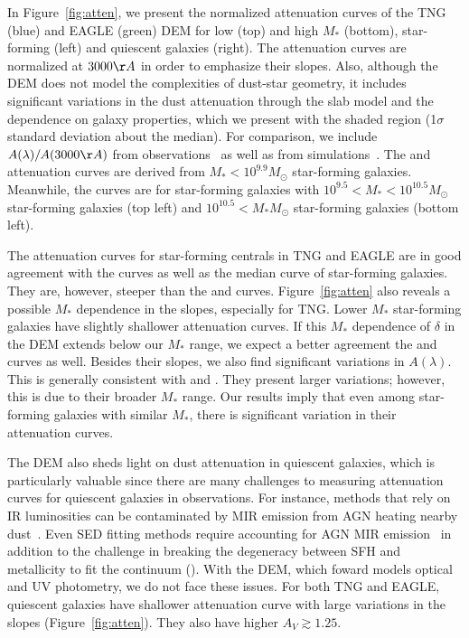 In Figure~\ref{fig:atten}, we present the normalized attenuation curves of the TNG
(blue) and EAGLE (green) DEM for low (top) and high $M_*$ (bottom),
star-forming (left) and quiescent galaxies (right). The attenuation curves are
normalized at $3000\AA$ in order to emphasize their slopes. Also, although the
DEM does not model the complexities of dust-star geometry, it includes
significant variations in the dust attenuation through the slab model
and the dependence on galaxy properties, which we present with the
shaded region (1$\sigma$ standard deviation about the median). For comparison, 
we include $A(\lambda)/A(3000\AA)$ from observations~\citep{calzetti2000, battisti2017, salim2018} 
as well as from simulations~\citep{narayanan2018}. The \cite{calzetti2000} and
\cite{battisti2017} attenuation curves are derived from $M_* < 10^{9.9}M_\odot$ 
star-forming galaxies. Meanwhile, the \cite{salim2018} curves are for
star-forming galaxies with $10^{9.5} < M_* < 10^{10.5}M_\odot$ star-forming
galaxies (top left) and $10^{10.5} < M_*M_\odot$ star-forming galaxies (bottom
left). 

The attenuation curves for star-forming centrals in TNG and EAGLE are in good 
agreement with the \cite{salim2018} curves as well as the median curve of
\cite{narayanan2018} star-forming galaxies. They are, however, steeper than 
the \cite{calzetti2000} and \cite{battisti2017} curves. Figure~\ref{fig:atten} 
also reveals a possible $M_*$ dependence in the slopes, especially for TNG.
Lower $M_*$ star-forming galaxies have slightly shallower attenuation curves.
If this $M_*$ dependence of $\delta$ in the DEM extends below our $M_*$ range, 
we expect a better agreement the \cite{calzetti2000} and \cite{battisti2017} 
curves as well. Besides their slopes, we also find significant variations in
$A(\lambda)$. This is generally consistent with \cite{salim2018} and
\cite{narayanan2018}. They present larger variations; however, this is due to
their broader $M_*$ range. Our results imply that even among star-forming
galaxies with similar $M_*$, there is significant variation in their attenuation
curves.

The DEM also sheds light on dust attenuation in quiescent galaxies, which is
particularly valuable since there are many challenges to measuring attenuation
curves for quiescent galaxies in observations. For instance, methods that rely
on IR luminosities can be contaminated by MIR emission from AGN heating nearby
dust~\cite{kirkpatrick2015}. Even SED fitting methods require accounting for
AGN MIR emission~\citep{salim2016, leja2018, salim2018} in addition to the
challenge in breaking the degeneracy between SFH and metallicity to fit the
continuum (). With the DEM, which foward models optical and UV
photometry, we do not face these issues. For both TNG and EAGLE, quiescent
galaxies have shallower attenuation curve with large variations in the slopes
(Figure~\ref{fig:atten}). They also have higher $A_V \gtrsim 1.25$. 

